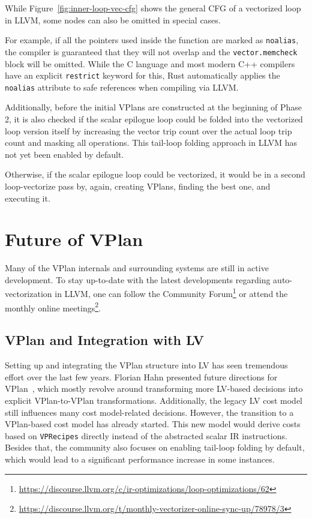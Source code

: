 \documentclass[sigplan,11pt,nonacm]{acmart}
\begin{document}
While Figure~\ref{fig:inner-loop-vec-cfg} shows the general CFG of a vectorized loop in LLVM, some 
nodes can also be omitted in special cases.

For example, if all the pointers used inside the function are marked as \texttt{noalias}, the compiler 
is guaranteed that they will not overlap and the \texttt{vector.memcheck} block will be omitted.
While the C language and most modern C++ compilers have an explicit \texttt{restrict} keyword for this,
Rust automatically applies the \texttt{noalias} attribute to safe references when compiling via LLVM.

Additionally, before the initial VPlans are constructed at the beginning of Phase 2, it is also checked if 
the scalar epilogue loop could be folded into the vectorized loop version itself by increasing the vector 
trip count over the actual loop trip count and masking all operations. This tail-loop folding approach in LLVM 
has not yet been enabled by default.

Otherwise, if the scalar epilogue loop could be vectorized, it would be in a second loop-vectorize 
pass by, again, creating VPlans, finding the best one, and executing it.

\section{Future of VPlan}
Many of the VPlan internals and surrounding systems are still in active development. To stay up-to-date 
with the latest developments regarding auto-vectorization in LLVM, one can follow the 
Community Forum\footnote{\url{https://discourse.llvm.org/c/ir-optimizations/loop-optimizations/62}} or
attend the monthly online 
meetings\footnote{\url{https://discourse.llvm.org/t/monthly-vectorizer-online-sync-up/78978/3}}.

\subsection{VPlan and Integration with LV}
Setting up and integrating the VPlan structure into LV has seen tremendous effort over the last 
few years. Florian Hahn presented future directions for 
VPlan~\cite{llvmvplanupdate}, which mostly revolve around transforming more LV-based decisions into
explicit VPlan-to-VPlan transformations. Additionally, the legacy LV cost model still influences 
many cost model-related decisions. However, the transition to a VPlan-based cost model has already 
started. This new model would derive costs based on \texttt{VPRecipes} directly instead of the 
abstracted scalar IR instructions. Besides that, the community also focuses on enabling tail-loop folding by
default, which would lead to a significant performance increase in some instances.
\end{document}
